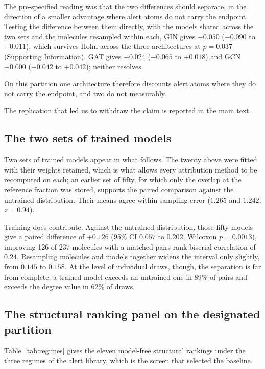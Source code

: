 \documentclass[journal=jcisd8,manuscript=suppinfo]{achemso}
\begin{document}
The pre-specified reading was that the two differences should separate, in the direction
of a smaller advantage where alert atoms do not carry the endpoint. Testing the difference
between them directly, with the models shared across the two sets and the molecules resampled
within each, GIN gives $-0.050$ ($-0.090$ to $-0.011$), which survives Holm
across the three architectures at $p = 0.037$ (Supporting Information). GAT gives $-0.024$
($-0.065$ to $+0.018$) and GCN $+0.000$ ($-0.042$ to $+0.042$); neither resolves.

On this partition one architecture therefore discounts alert atoms where they do not carry
the endpoint, and two do not measurably.

The replication that led us to withdraw the claim is reported in the main text.

\subsection{The two sets of trained models}

Two sets of trained models appear in what follows. The twenty above were fitted with their
weights retained, which is what allows every attribution method to be recomputed on each; an
earlier set of fifty, for which only the overlap at the reference fraction was stored,
supports the paired comparison against the untrained distribution. Their means agree within
sampling error ($1.265$ and $1.242$, $z = 0.94$).

Training does contribute. Against the untrained distribution, those fifty models give a
paired difference of $+0.126$ (95\% CI $0.057$ to $0.202$, Wilcoxon $p = 0.0013$), improving
126 of 237 molecules with a matched-pairs rank-biserial correlation of $0.24$. Resampling
molecules and models together widens the interval only slightly, from $0.145$ to $0.158$. At
the level of individual draws, though, the separation is far from complete: a trained model
exceeds an untrained one in 89\% of pairs and exceeds the degree value in 62\% of draws.

\subsection{The structural ranking panel on the designated partition}

Table~\ref{tab:regimes} gives the eleven model-free structural rankings under the three
regimes of the alert library, which is the screen that selected the baseline.
\end{document}
